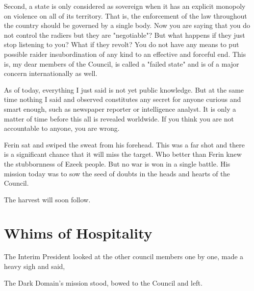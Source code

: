{Second, a state is only considered as sovereign when it has an explicit monopoly on violence on all of its territory. That is, the enforcement of the law throughout the country should be governed by a single body. Now you are saying that you do not control the radiers but they are "negotiable"? But what happens if they just stop listening to you? What if they revolt? You do not have any means to put possible raider insubordination of any kind to an effective and forceful end. This is, my dear members of the Council, is called a "failed state" and is of a major concern internationally as well.

As of today, everything I just said is not yet public knowledge. But at the same time nothing I said and observed constitutes any secret for anyone curious and smart enough, such as newspaper reporter or intelligence analyst. It is only a matter of time before this all is revealed worldwide. If you think you are not accountable to anyone, you are wrong.}

Ferin sat and swiped the sweat from his forehead. This was a far shot and there is a significant chance that it will miss the target. Who better than Ferin knew the stubbornness of Ezeek people. But no war is won in a single battle. His mission today was to sow the seed of doubts in the heads and hearts of the Council.

The harvest will soon follow.

\section{Whims of Hospitality}

The Interim President looked at the other council members one by one, made a heavy sigh and said, 

The Dark Domain's mission stood, bowed to the Council and left.

